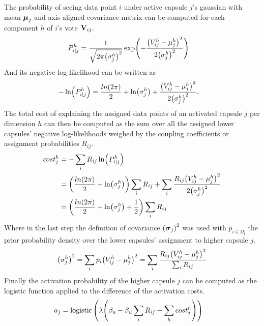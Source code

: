 The probability of seeing data point $i$ under active capsule $j$'s gaussian with mean $\vb*{\mu}_j$ and axis aligned covariance matrix can be computed for each component $h$ of $i$'s vote $\vb{V}_{ij}$.
\begin{align}
    P_{i|j}^h &= \frac{1}{\sqrt{2\pi\qty(\sigma_j^h)^2}}\exp(-\frac{\qty(V_{ij}^h-\mu_j^h)^2}{2\qty(\sigma_j^h)^2})
\end{align}
And its negative log-likelihood can be written as
\begin{align}
    -\ln(P_{i|j}^h) &= \frac{ln(2\pi)}{2}+\ln(\sigma_j^h)+\frac{\qty(V_{ij}^h-\mu_j^h)^2}{2\qty(\sigma_j^h)^2}.
\end{align}
The total cost of explaining the assigned data points of an activated capsule $j$ per dimension $h$ can then be computed as the sum over all the assigned lower capsules' negative log-likelihoods weighed by the coupling coefficients or assignment probabilities $R_{ij}$.
\begin{align}
    cost_j^h &= - \sum_i R_{ij} \ln(P_{i|j}^h)\\
    &= \qty(\frac{ln(2\pi)}{2}+\ln(\sigma_j^h))\sum_i R_{ij}+\sum_i\frac{R_{ij}\qty(V_{ij}^h-\mu_j^h)^2}{2\qty(\sigma_j^h)^2}\\
    &= \qty(\frac{ln(2\pi)}{2}+\ln(\sigma_j^h) + \frac{1}{2})\sum_i R_{ij}
\end{align}
Where in the last step the definition of covariance $\qty(\vb*{\sigma}_j)^2$ was used with $p_{i\in\Omega_l}$ the prior probability density over the lower capsules' assignment to higher capsule $j$.
\begin{align}
    \qty(\sigma_j^h)^2 = \sum_i p_i\qty(V_{ij}^h-\mu_j^h)^2 = \sum_i\frac{R_{ij} \qty(V_{ij}^h-\mu_j^h)^2}{\sum_i R_{ij}}
\end{align}
Finally the activation probability of the higher capsule $j$ can be computed as the logistic function applied to the difference of the activation costs.
\begin{align*}
    a_j &= \operatorname{logistic}\qty(\lambda\qty(\beta_a-\beta_u\sum_i R_{ij}-\sum_h cost_j^h))
\end{align*}
